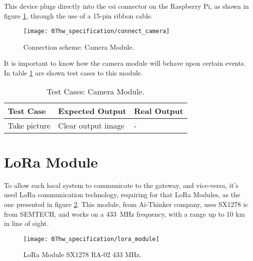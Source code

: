 \clearpage
{}
This device plugs directly into the \ac{csi} connector on the Raspberry Pi, as shown in figure \ref{fig:connect_camera}, through the use of a 15-pin ribbon cable.

\begin{figure}[ht]
	\centering
	\texttt{[image: 07hw\_specification/connect\_camera]}
	\caption{Connection scheme: Camera Module.}
	\label{fig:connect_camera}
\end{figure}

It is important to know how the camera module will behave upon certain events. In table \ref{table:test_camera} are shown test cases to this module.

\begin{table}[H]
	\centering
	\resizebox{\columnwidth}{!}
	{
	\begin{tabular}{|m{3cm}|m{5cm}||m{5cm}|}
		\hline
		\textbf{Test Case} & \textbf{Expected Output} & \textbf{Real Output}
		\\\hline\hline
		Take picture & Clear output image & -
		\\\hline
	\end{tabular}
	}
	\caption{Test Cases: Camera Module.}
	\label{table:test_camera}
\end{table}


\clearpage
\section{LoRa Module}
To allow each local system to communicate to the gateway, and vice-versa, it's used LoRa communication technology, requiring for that LoRa Modules, as the one presented in figure \ref{fig:lora_module}. This module, from Ai-Thinker company, uses SX1278 \ac{ic} from SEMTECH, and works on a 433~MHz frequency, with a range up to 10 km in line of sight. \cite{sx1278} \cite{lora_module}

\begin{figure}[H]
	\centering
	\texttt{[image: 07hw\_specification/lora\_module]}
	\caption{LoRa Module SX1278 RA-02 433 MHz.}
	\label{fig:lora_module}
\end{figure}

